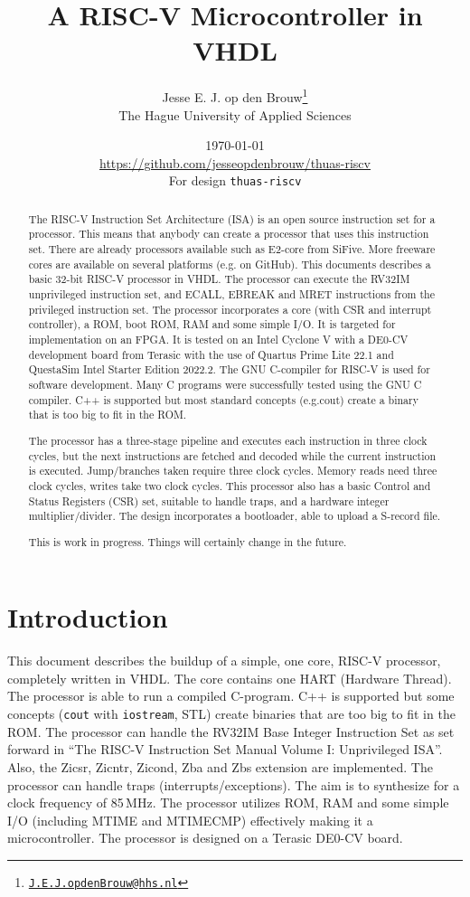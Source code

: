 \documentclass[12pt]{article}
\author{Jesse E. J. op den Brouw\thanks{\href{mailto:J.E.J.opdenBrouw@hhs.nl}{\texttt{J.E.J.opdenBrouw@hhs.nl}}}\\[2ex]The Hague University of Applied Sciences}
\title{A RISC-V Microcontroller in VHDL}
\date{\today\\[2ex]\normalsize\url{https://github.com/jesseopdenbrouw/thuas-riscv}\\[2ex]For design \texttt{thuas-riscv}}
\begin{document}
\maketitle

\vfill
\begin{abstract}
\baselineskip
\noindent
The RISC-V Instruction Set Architecture (ISA) is an open source instruction set for a processor. This means that anybody can create a processor that uses this instruction set. There are already processors available such as E2-core from SiFive. More freeware cores are available on several platforms (e.g. on GitHub). This documents describes a basic 32-bit RISC-V processor in VHDL. The processor can execute the RV32IM unprivileged instruction set, and ECALL, EBREAK and MRET instructions from the privileged instruction set. The processor incorporates a core (with CSR and  interrupt controller), a ROM, boot ROM, RAM and some simple I/O. It is targeted for implementation on an FPGA. It is tested on an Intel Cyclone V with a DE0-CV development board from Terasic with the use of Quartus Prime Lite 22.1 and QuestaSim Intel Starter Edition 2022.2. The GNU C-compiler for RISC-V is used for software development. Many C programs were successfully tested using the GNU C compiler. C++ is supported but most standard concepts (e.g.\@ cout) create a binary that is too big to fit in the ROM.

\noindent
The processor has a three-stage pipeline and executes each instruction in three clock cycles, but the next instructions are fetched and decoded while the current instruction is executed. Jump/branches taken require three clock cycles. Memory reads need three clock cycles, writes take two clock cycles. This processor also has a basic Control and Status Registers (CSR) set, suitable to handle traps, and a hardware integer multiplier/divider. The design incorporates a bootloader, able to upload a S-record file.

\noindent
This is work in progress. Things will certainly change in the future.
\end{abstract}
\vfill

\clearpage
\tableofcontents

\clearpage
\section{Introduction}
This document describes the buildup of a simple, one core, RISC-V processor, completely written in VHDL. The core contains one HART (Hardware Thread). The processor is able to run a compiled C-program. C++ is supported but some concepts (\texttt{cout} with \texttt{iostream}, STL) create binaries that are too big to fit in the ROM. The processor can handle the RV32IM Base Integer Instruction Set as set forward in ``The RISC-V Instruction Set Manual Volume I: Unprivileged ISA''. Also, the Zicsr, Zicntr, Zicond, Zba and Zbs extension are implemented. The processor can handle traps (interrupts/exceptions). The aim is to synthesize for a clock frequency of 85\,MHz. The processor utilizes ROM, RAM and some simple I/O (including MTIME and MTIMECMP) effectively making it a microcontroller. The processor is designed on a Terasic DE0-CV board.
\end{document}
